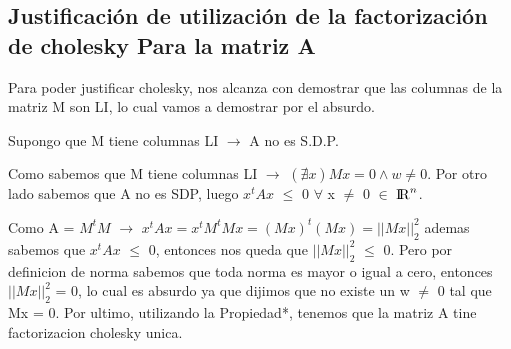 

\subsection{Justificación de utilización de la factorización de cholesky Para la matriz A}

Para poder justificar cholesky, nos alcanza con demostrar que las columnas de la matriz M son LI, lo cual vamos a demostrar por el absurdo.\par
\indent Supongo que M tiene columnas LI $\rightarrow$ A no es S.D.P. \par 
\indent Como sabemos que M tiene columnas LI $\rightarrow$ $(\nexists x ) Mx = 0 \land w \neq 0 $. Por otro lado sabemos que A no es SDP, luego $x^{t}Ax$ $\leq$ 0 $\forall$ x $\neq$ 0 $\in$ ${\rm I\!R}^{n}$.\par Como A = $M^{t}M$ $\rightarrow$ $x^{t}Ax = x^{t}M^{t}Mx = (Mx)^{t}(Mx) = ||Mx||_{2}^{2}$ ademas sabemos que $x^{t}Ax$ $\leq$ 0, entonces nos queda que $||Mx||_{2}^{2}$ $\leq$ 0. Pero por definicion de norma sabemos que toda norma es mayor o igual a cero, entonces $||Mx||_{2}^{2}$ = 0, lo cual es absurdo ya que dijimos que no existe un w $\neq$ 0 tal que Mx = 0. Por ultimo, utilizando la Propiedad*, tenemos que la matriz A tine factorizacion cholesky unica.

